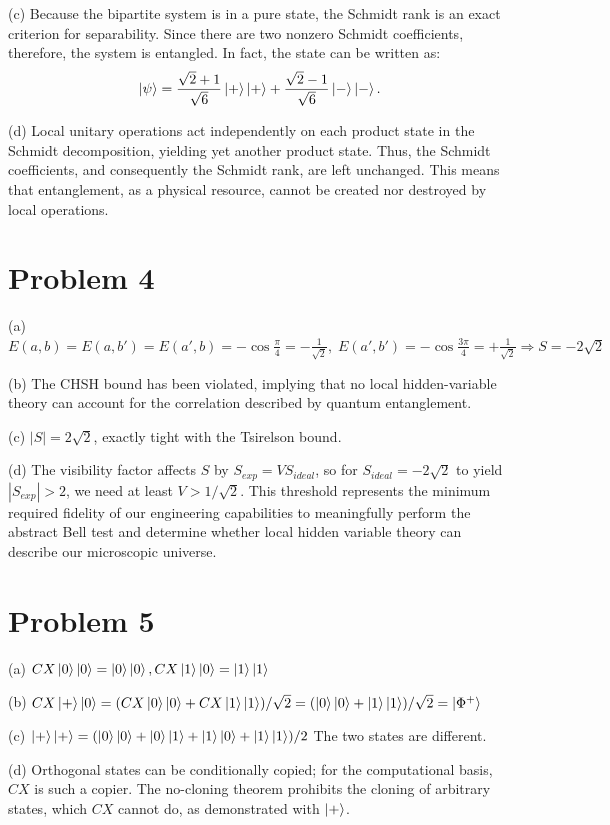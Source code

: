 \documentclass[11pt]{article}
\begin{document}
\noindent
(c) Because the bipartite system is in a pure state,
the Schmidt rank is an exact criterion for separability.
Since there are two nonzero Schmidt coefficients, therefore, the system is entangled.
In fact, the state can be written as:
\[
    \ket{\psi} = \frac{\sqrt{2}+1}{\sqrt{6}}\ket{+}\ket{+} + \frac{\sqrt{2}-1}{\sqrt{6}}\ket{-}\ket{-}.
\]

\noindent
(d) Local unitary operations act independently on each product state in the Schmidt decomposition,
yielding yet another product state.
Thus, the Schmidt coefficients, and consequently the Schmidt rank, are left unchanged.
This means that entanglement, as a physical resource, cannot be created nor destroyed by local operations.

\section*{Problem 4}
\noindent
(a) $E(a,b) = E(a,b') = E(a',b) = -\cos\frac{\pi}{4} = -\frac{1}{\sqrt{2}},\;
E(a', b') = -\cos\frac{3\pi}{4} = +\frac{1}{\sqrt{2}}
\Rightarrow S = -2\sqrt{2}$

\noindent
(b) The CHSH bound has been violated, implying that no local hidden-variable theory
can account for the correlation described by quantum entanglement.

\noindent
(c) $|S| = 2\sqrt{2}$, exactly tight with the Tsirelson bound.

\noindent
(d) The visibility factor affects $S$ by $S_{exp} = VS_{ideal}$,
so for $S_{ideal} = -2\sqrt{2}$ to yield $|S_{exp}| > 2$,
we need at least $V > 1/\sqrt{2}$.
This threshold represents the minimum required fidelity of our engineering capabilities
to meaningfully perform the abstract Bell test and determine whether local hidden variable theory
can describe our microscopic universe.

\section*{Problem 5}
\noindent
(a) $CX\ket{0}\ket{0} = \ket{0}\ket{0}, CX\ket{1}\ket{0} = \ket{1}\ket{1}$

\noindent
(b) $CX\ket{+}\ket{0} = (CX\ket{0}\ket{0} + CX\ket{1}\ket{1})/\sqrt{2}
= (\ket{0}\ket{0} + \ket{1}\ket{1})/\sqrt{2} = \ket{\Phi^+}$

\noindent
(c) $\ket{+}\ket{+} = (\ket{0}\ket{0} + \ket{0}\ket{1} + \ket{1}\ket{0} + \ket{1}\ket{1}) / 2$
The two states are different.

\noindent
(d) Orthogonal states can be conditionally copied; for the computational basis, $CX$ is such a copier.
The no-cloning theorem prohibits the cloning of arbitrary states, which $CX$ cannot do, as demonstrated with $\ket{+}$.
\end{document}
